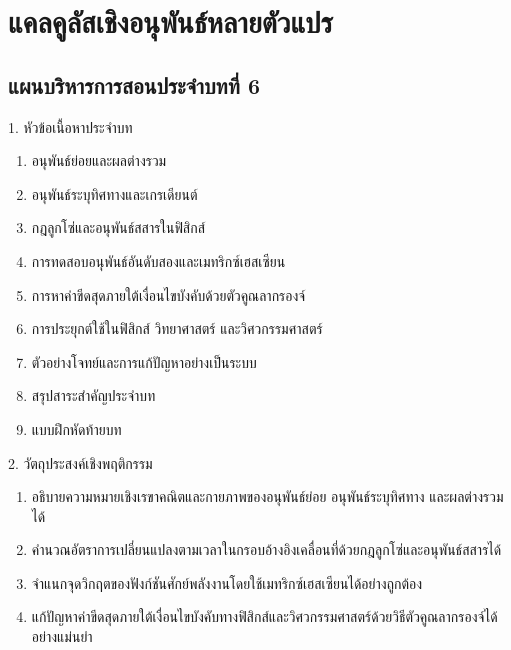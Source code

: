 \chapter{แคลคูลัสเชิงอนุพันธ์หลายตัวแปร}

\section*{แผนบริหารการสอนประจำบทที่ 6}

\begin{planbox}[colframe=rbruNavy, colbacktitle=rbruNavy]{1. หัวข้อเนื้อหาประจำบท}
\begin{enumerate}[topsep=2pt, itemsep=1pt, partopsep=0pt, parsep=0pt, leftmargin=1.5em]
    \item อนุพันธ์ย่อยและผลต่างรวม
    \item อนุพันธ์ระบุทิศทางและเกรเดียนต์
    \item กฎลูกโซ่และอนุพันธ์สสารในฟิสิกส์
    \item การทดสอบอนุพันธ์อันดับสองและเมทริกซ์เฮสเซียน
    \item การหาค่าขีดสุดภายใต้เงื่อนไขบังคับด้วยตัวคูณลากรองจ์
    \item การประยุกต์ใช้ในฟิสิกส์ วิทยาศาสตร์ และวิศวกรรมศาสตร์
    \item ตัวอย่างโจทย์และการแก้ปัญหาอย่างเป็นระบบ
    \item สรุปสาระสำคัญประจำบท
    \item แบบฝึกหัดท้ายบท
\end{enumerate}
\end{planbox}

\begin{planbox}[colframe=rbruGreen, colbacktitle=rbruGreen]{2. วัตถุประสงค์เชิงพฤติกรรม}
\begin{enumerate}[topsep=2pt, itemsep=1pt, partopsep=0pt, parsep=0pt, leftmargin=1.5em]
    \item อธิบายความหมายเชิงเรขาคณิตและกายภาพของอนุพันธ์ย่อย อนุพันธ์ระบุทิศทาง และผลต่างรวมได้
    \item คำนวณอัตราการเปลี่ยนแปลงตามเวลาในกรอบอ้างอิงเคลื่อนที่ด้วยกฎลูกโซ่และอนุพันธ์สสารได้
    \item จำแนกจุดวิกฤตของฟังก์ชันศักย์พลังงานโดยใช้เมทริกซ์เฮสเซียนได้อย่างถูกต้อง
    \item แก้ปัญหาค่าขีดสุดภายใต้เงื่อนไขบังคับทางฟิสิกส์และวิศวกรรมศาสตร์ด้วยวิธีตัวคูณลากรองจ์ได้อย่างแม่นยำ
\end{enumerate}
\end{planbox}

